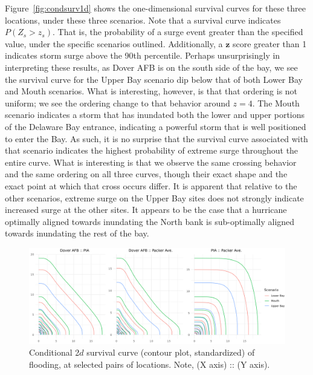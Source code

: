 Figure~\ref{fig:condsurv1d} shows the one-dimensional survival curves for these three locations, 
    under these three scenarios.  Note that a survival curve indicates $P(Z_s > z_s)$.  That is, 
    the probability of a surge event greater than the specified value, under the specific
    scenarios outlined.  Additionally, a $\bm{z}$ score greater than 1 indicates storm surge 
    above the 90th percentile.  Perhaps unsurprisingly in interpreting these results, as Dover 
    AFB is on the south side of the bay, we see the survival curve for the Upper Bay scenario 
    dip below that of both Lower Bay and Mouth scenarios.  What is interesting, however, is 
    that that ordering is not uniform; we see the ordering change to that behavior around $z = 4$.  
    The Mouth scenario indicates a storm that has inundated both the lower and upper portions 
    of the Delaware Bay entrance, indicating a powerful storm that is well positioned to enter 
    the Bay.  As such, it is no surprise that the survival curve associated with that scenario
    indicates the highest probability of extreme surge throughout the entire curve.  What is 
    interesting is that we observe the same crossing behavior and the same ordering on all 
    three curves, though their exact shape and the exact point at which that cross occurs 
    differ.  It is apparent that relative to the other scenarios, extreme surge on the Upper 
    Bay sites does not strongly indicate increased surge at the other sites.  It appears to 
    be the case that a hurricane optimally aligned towards inundating the North bank is 
    sub-optimally aligned towards inundating the rest of the bay.

\begin{figure}[tb]
    \centering
    \includegraphics[width=.95\linewidth]{plots/condsurv/condsurv_2d_mcmc.png}
    \caption{Conditional 2$d$ survival curve (contour plot, standardized) of flooding, at selected 
        pairs of locations. Note, (X axis) :: (Y axis). \label{fig:condsurv2d}
        }
\end{figure}


